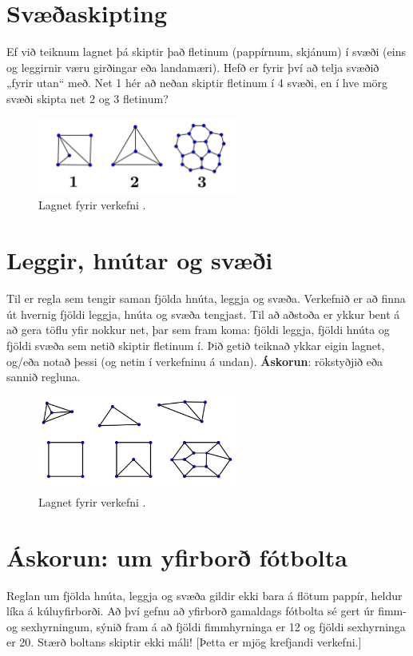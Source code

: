 \documentclass[b5paper,12pt]{book}
\renewcommand*\thesection{\arabic{section}}
\begin{document}
\section{Svæðaskipting}
Ef við teiknum lagnet þá skiptir það fletinum (pappírnum, skjánum) í svæði (eins og leggirnir væru girðingar eða landamæri). Hefð er fyrir því að telja svæðið „fyrir utan“ með. Net 1 hér að neðan skiptir fletinum í 4 svæði, en í hve mörg svæði skipta net 2 og 3 fletinum?

\begin{figure}[h]
  \includegraphics[width=0.6\textwidth, center]{Myndir/3Svaedi_lagnet.png}
  \caption*{Lagnet fyrir verkefni \thesection{}.}
\end{figure}

\section{Leggir, hnútar og svæði}
\label{sec:eulerchar}
Til er regla sem tengir saman fjölda hnúta, leggja og svæða. Verkefnið er að finna út hvernig fjöldi leggja, hnúta og svæða tengjast. Til að aðstoða er ykkur bent á að gera töflu yfir nokkur net, þar sem fram koma: fjöldi leggja, fjöldi hnúta og fjöldi svæða sem netið skiptir fletinum í. Þið getið teiknað ykkar eigin lagnet, og/eða notað þessi (og netin í verkefninu á undan).
\noindent
\textbf{Áskorun}: rökstyðjið eða sannið regluna.

\begin{figure}[h]
  \includegraphics[width=0.6\textwidth, center]{Myndir/Nokkur_lagnet.png}
  \caption*{Lagnet fyrir verkefni \thesection{}.}
\end{figure}

\section{Áskorun: um yfirborð fótbolta}
\label{sec:fotbolti}
Reglan um fjölda hnúta, leggja og svæða gildir ekki bara á flötum pappír, heldur líka á kúluyfirborði. Að því gefnu að yfirborð gamaldags fótbolta sé gert úr fimm- og sexhyrningum, sýnið fram á að fjöldi fimmhyrninga er 12 og fjöldi sexhyrninga er 20. Stærð boltans skiptir ekki máli! [Þetta er mjög krefjandi verkefni.]
\end{document}
